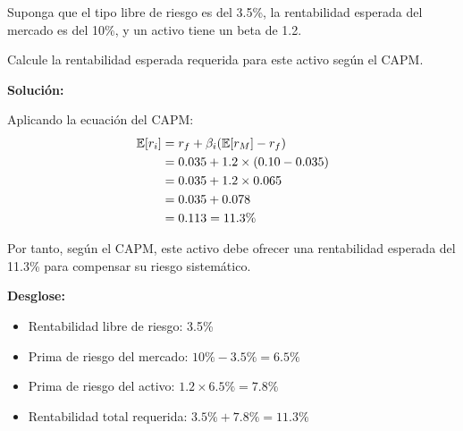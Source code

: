 \begin{ejemplo}
Suponga que el tipo libre de riesgo es del 3.5\%, la rentabilidad esperada del mercado es del 10\%, y un activo tiene un beta de 1.2.

Calcule la rentabilidad esperada requerida para este activo según el CAPM.

\textbf{Solución:}

Aplicando la ecuación del CAPM:
\begin{align*}
\mathbb{E}[r_i] &= r_f + \beta_i (\mathbb{E}[r_M] - r_f) \\
&= 0.035 + 1.2 \times (0.10 - 0.035) \\
&= 0.035 + 1.2 \times 0.065 \\
&= 0.035 + 0.078 \\
&= 0.113 = 11.3\%
\end{align*}

Por tanto, según el CAPM, este activo debe ofrecer una rentabilidad esperada del 11.3\% para compensar su riesgo sistemático.

\textbf{Desglose:}
\begin{itemize}
\item Rentabilidad libre de riesgo: 3.5\%
\item Prima de riesgo del mercado: $10\% - 3.5\% = 6.5\%$
\item Prima de riesgo del activo: $1.2 \times 6.5\% = 7.8\%$
\item Rentabilidad total requerida: $3.5\% + 7.8\% = 11.3\%$
\end{itemize}
\end{ejemplo}

